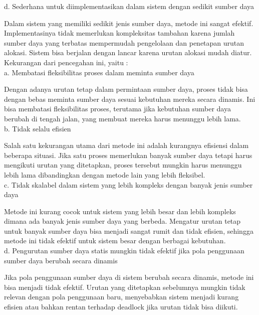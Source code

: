 \documentclass[12pt]{article}
\begin{document}
    d. Sederhana untuk diimplementasikan dalam sistem dengan sedikit sumber daya
    
    Dalam sistem yang memiliki sedikit jenis sumber daya, metode ini sangat efektif. Implementasinya tidak memerlukan kompleksitas tambahan karena jumlah sumber daya yang terbatas mempermudah pengelolaan dan penetapan urutan alokasi. Sistem bisa berjalan dengan lancar karena urutan alokasi mudah diatur.\\

    Kekurangan dari pencegahan ini, yaitu :\\

    a. Membatasi fleksibilitas proses dalam meminta sumber daya
    
    Dengan adanya urutan tetap dalam permintaan sumber daya, proses tidak bisa dengan bebas meminta sumber daya sesuai kebutuhan mereka secara dinamis. Ini bisa membatasi fleksibilitas proses, terutama jika kebutuhan sumber daya berubah di tengah jalan, yang membuat mereka harus menunggu lebih lama.\\

    b. Tidak selalu efisien
    
    Salah satu kekurangan utama dari metode ini adalah kurangnya efisiensi dalam beberapa situasi. Jika satu proses memerlukan banyak sumber daya tetapi harus mengikuti urutan yang ditetapkan, proses tersebut mungkin harus menunggu lebih lama dibandingkan dengan metode lain yang lebih fleksibel.\\

    c. Tidak skalabel dalam sistem yang lebih kompleks dengan banyak jenis sumber daya
    
    Metode ini kurang cocok untuk sistem yang lebih besar dan lebih kompleks dimana ada banyak jenis sumber daya yang berbeda. Mengatur urutan tetap untuk banyak sumber daya bisa menjadi sangat rumit dan tidak efisien, sehingga metode ini tidak efektif untuk sistem besar dengan berbagai kebutuhan.\\

    d. Pengurutan sumber daya statis mungkin tidak efektif jika pola penggunaan sumber daya berubah secara dinamis
    
    Jika pola penggunaan sumber daya di sistem berubah secara dinamis, metode ini bisa menjadi tidak efektif. Urutan yang ditetapkan sebelumnya mungkin tidak relevan dengan pola penggunaan baru, menyebabkan sistem menjadi kurang efisien atau bahkan rentan terhadap deadlock jika urutan tidak bisa diikuti.\\
\end{document}
